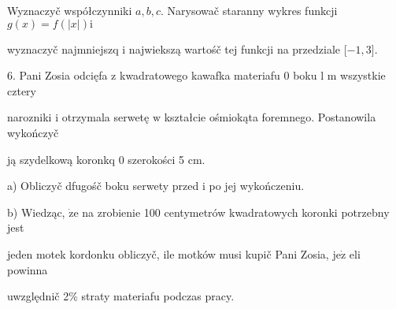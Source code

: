 \documentclass[a4paper,12pt]{article}
\begin{document}
Wyznaczyč współczynniki $a, b, c$. Narysowač staranny wykres funkcji $g(x) = f(|x|) \mathrm{i}$

wyznaczyč najmniejszq $\mathrm{i}$ najwiekszą wartośč tej funkcji na przedziale [$-1,3].$

6. Pani Zosia odcięfa $\mathrm{z}$ kwadratowego kawafka materiafu $0$ boku l $\mathrm{m}$ wszystkie cztery

narozniki $\mathrm{i}$ otrzymala serwetę $\mathrm{w}$ kształcie ośmiokąta foremnego. Postanowila wykończyč

ją szydelkową koronkq $0$ szerokości 5 cm.

a) Obliczyč dfugośč boku serwety przed $\mathrm{i}$ po jej wykończeniu.

b) Wiedząc, $\dot{\mathrm{z}}\mathrm{e}$ na zrobienie 100 centymetrów kwadratowych koronki potrzebny jest

jeden motek kordonku obliczyč, ile motków musi kupič Pani Zosia, $\mathrm{j}\mathrm{e}\dot{\mathrm{z}}$ eli powinna

uwzględnič 2\% straty materiafu podczas pracy.
\end{document}
